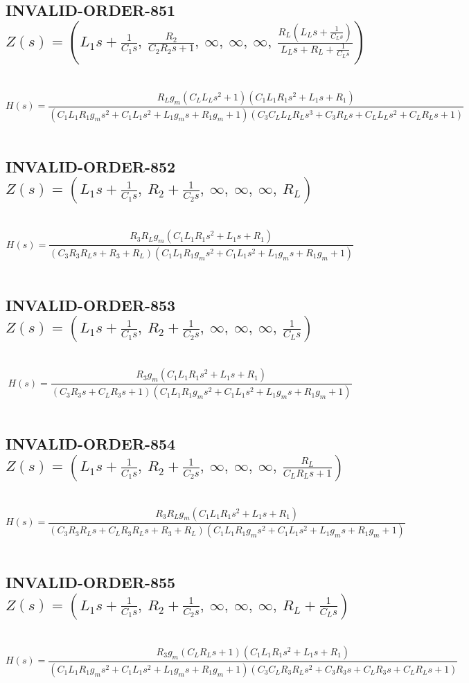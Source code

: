 \documentclass{article}
\begin{document}
\subsection{INVALID-ORDER-851 $Z(s) = \left( L_{1} s + \frac{1}{C_{1} s}, \  \frac{R_{2}}{C_{2} R_{2} s + 1}, \  \infty, \  \infty, \  \infty, \  \frac{R_{L} \left(L_{L} s + \frac{1}{C_{L} s}\right)}{L_{L} s + R_{L} + \frac{1}{C_{L} s}}\right)$ } \ 
\textbf{\[H(s) = \frac{R_{L} g_{m} \left(C_{L} L_{L} s^{2} + 1\right) \left(C_{1} L_{1} R_{1} s^{2} + L_{1} s + R_{1}\right)}{\left(C_{1} L_{1} R_{1} g_{m} s^{2} + C_{1} L_{1} s^{2} + L_{1} g_{m} s + R_{1} g_{m} + 1\right) \left(C_{3} C_{L} L_{L} R_{L} s^{3} + C_{3} R_{L} s + C_{L} L_{L} s^{2} + C_{L} R_{L} s + 1\right)}\] } \ 
\subsection{INVALID-ORDER-852 $Z(s) = \left( L_{1} s + \frac{1}{C_{1} s}, \  R_{2} + \frac{1}{C_{2} s}, \  \infty, \  \infty, \  \infty, \  R_{L}\right)$ } \ 
\textbf{\[H(s) = \frac{R_{3} R_{L} g_{m} \left(C_{1} L_{1} R_{1} s^{2} + L_{1} s + R_{1}\right)}{\left(C_{3} R_{3} R_{L} s + R_{3} + R_{L}\right) \left(C_{1} L_{1} R_{1} g_{m} s^{2} + C_{1} L_{1} s^{2} + L_{1} g_{m} s + R_{1} g_{m} + 1\right)}\] } \ 
\subsection{INVALID-ORDER-853 $Z(s) = \left( L_{1} s + \frac{1}{C_{1} s}, \  R_{2} + \frac{1}{C_{2} s}, \  \infty, \  \infty, \  \infty, \  \frac{1}{C_{L} s}\right)$ } \ 
\textbf{\[H(s) = \frac{R_{3} g_{m} \left(C_{1} L_{1} R_{1} s^{2} + L_{1} s + R_{1}\right)}{\left(C_{3} R_{3} s + C_{L} R_{3} s + 1\right) \left(C_{1} L_{1} R_{1} g_{m} s^{2} + C_{1} L_{1} s^{2} + L_{1} g_{m} s + R_{1} g_{m} + 1\right)}\] } \ 
\subsection{INVALID-ORDER-854 $Z(s) = \left( L_{1} s + \frac{1}{C_{1} s}, \  R_{2} + \frac{1}{C_{2} s}, \  \infty, \  \infty, \  \infty, \  \frac{R_{L}}{C_{L} R_{L} s + 1}\right)$ } \ 
\textbf{\[H(s) = \frac{R_{3} R_{L} g_{m} \left(C_{1} L_{1} R_{1} s^{2} + L_{1} s + R_{1}\right)}{\left(C_{3} R_{3} R_{L} s + C_{L} R_{3} R_{L} s + R_{3} + R_{L}\right) \left(C_{1} L_{1} R_{1} g_{m} s^{2} + C_{1} L_{1} s^{2} + L_{1} g_{m} s + R_{1} g_{m} + 1\right)}\] } \ 
\subsection{INVALID-ORDER-855 $Z(s) = \left( L_{1} s + \frac{1}{C_{1} s}, \  R_{2} + \frac{1}{C_{2} s}, \  \infty, \  \infty, \  \infty, \  R_{L} + \frac{1}{C_{L} s}\right)$ } \ 
\textbf{\[H(s) = \frac{R_{3} g_{m} \left(C_{L} R_{L} s + 1\right) \left(C_{1} L_{1} R_{1} s^{2} + L_{1} s + R_{1}\right)}{\left(C_{1} L_{1} R_{1} g_{m} s^{2} + C_{1} L_{1} s^{2} + L_{1} g_{m} s + R_{1} g_{m} + 1\right) \left(C_{3} C_{L} R_{3} R_{L} s^{2} + C_{3} R_{3} s + C_{L} R_{3} s + C_{L} R_{L} s + 1\right)}\] } \ 
\end{document}
